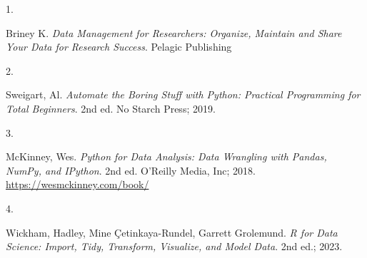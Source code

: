 \documentclass[
  letterpaper,
  DIV=11,
  numbers=noendperiod]{scrreprt}
\newlength{\cslhangindent}
\newlength{\csllabelwidth}
\newenvironment{CSLReferences}[2] %
 {\begin{list}{}{%
  \setlength{\itemindent}{0pt}
  \setlength{\leftmargin}{0pt}
  \setlength{\parsep}{0pt}
  \ifodd #1
   \setlength{\leftmargin}{\cslhangindent}
   \setlength{\itemindent}{-1\cslhangindent}
  \fi
  \setlength{\itemsep}{#2\baselineskip}}}
 {\end{list}}
\newcommand{\CSLLeftMargin}[1]{\parbox[t]{\csllabelwidth}{\strut#1\strut}}
\newcommand{\CSLRightInline}[1]{\parbox[t]{\linewidth - \csllabelwidth}{\strut#1\strut}}
\begin{document}
\label{refs}
\begin{CSLReferences}{0}{1}
\CSLLeftMargin{1. }%
\CSLRightInline{Briney K. \emph{Data Management for Researchers:
Organize, Maintain and Share Your Data for Research Success}. Pelagic
Publishing}

\CSLLeftMargin{2. }%
\CSLRightInline{Sweigart, Al. \emph{Automate the Boring Stuff with
Python: Practical Programming for Total Beginners}. 2nd ed. No Starch
Press; 2019.}

\CSLLeftMargin{3. }%
\CSLRightInline{McKinney, Wes. \emph{Python for Data Analysis: Data
Wrangling with Pandas, NumPy, and IPython}. 2nd ed. O'Reilly Media, Inc;
2018. \url{https://wesmckinney.com/book/}}

\CSLLeftMargin{4. }%
\CSLRightInline{Wickham, Hadley, Mine Çetinkaya-Rundel, Garrett
Grolemund. \emph{R for Data Science: Import, Tidy, Transform, Visualize,
and Model Data}. 2nd ed.; 2023.}

\end{CSLReferences}
\end{document}
